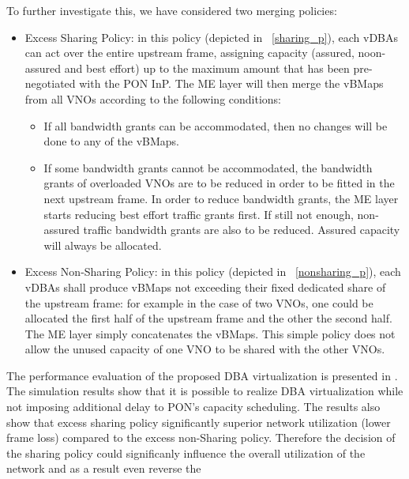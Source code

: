 To further investigate this, we have considered two merging policies:
\begin{itemize}
    \item Excess Sharing Policy: in this policy (depicted in \figureautorefname~\ref{sharing_p}), each \acp{vDBA} can act over the entire upstream frame, assigning capacity (assured, noon-assured and best effort) up to the maximum amount that has been pre-negotiated with the \ac{PON} \ac{InP}. The \ac{ME} layer will then merge the \acp{vBMap} from all \acp{VNO} according to the following conditions:
        \begin{itemize}
            \item If all bandwidth grants can be accommodated, then no changes will be done to any of the \acp{vBMap}.
            
            \item If some bandwidth grants cannot be accommodated, the bandwidth grants of overloaded \acp{VNO} are to be reduced in order to be fitted in the next upstream frame. In order to reduce bandwidth grants, the \ac{ME} layer starts reducing best effort traffic grants first. If still not enough, non-assured traffic bandwidth grants are also to be reduced. Assured capacity will always be allocated.
        \end{itemize}

    \item Excess Non-Sharing Policy: in this policy (depicted in \figureautorefname~\ref{nonsharing_p}), each \acp{vDBA} shall produce \acp{vBMap} not exceeding their fixed dedicated share of the upstream frame: for example in the case of two \acp{VNO}, one could be allocated the first half of the upstream frame and the other the second half. The \ac{ME} layer simply concatenates the \acp{vBMap}. This simple policy does not allow the unused capacity of one \ac{VNO} to be shared with the other \acp{VNO}.
\end{itemize}

The performance evaluation of the proposed \ac{DBA} virtualization is presented in \cite{Elrasad:17}. The simulation results show that it is possible to realize \ac{DBA} virtualization while not imposing additional delay to \ac{PON}'s capacity scheduling. The results also show that excess sharing policy significantly superior network utilization (lower frame loss) compared to the excess non-Sharing policy. Therefore the decision of the sharing policy could significanly influence the overall utilization of the network and as a result even reverse the 


